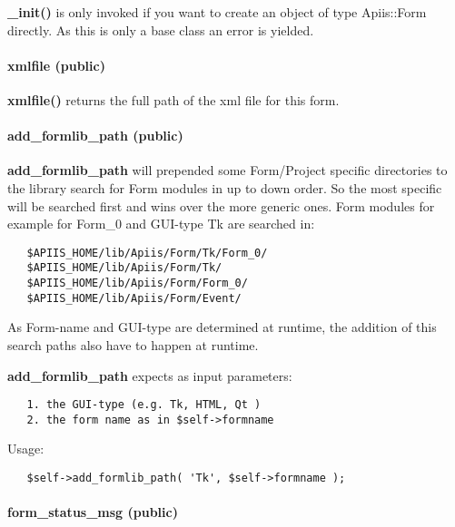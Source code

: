 \textbf{\_init()} is only invoked if you want to create an object of type
Apiis::Form directly. As this is only a base class an error is yielded.

\paragraph*{xmlfile (public)\label{Apiis::Form::Init_--_base_package_for_Form_objects_of_all_types_xmlfile_public_}}


\textbf{xmlfile()} returns the full path of the xml file for this form.

\paragraph*{add\_formlib\_path (public)\label{Apiis::Form::Init_--_base_package_for_Form_objects_of_all_types_add_formlib_path_public_}}


\textbf{add\_formlib\_path} will prepended some Form/Project specific directories to
the library search for Form modules in up to down order. So the most specific
will be searched first and wins over the more generic ones. Form modules for
example for Form\_0 and GUI-type Tk are searched in:

\begin{verbatim}
   $APIIS_HOME/lib/Apiis/Form/Tk/Form_0/
   $APIIS_HOME/lib/Apiis/Form/Tk/
   $APIIS_HOME/lib/Apiis/Form/Form_0/
   $APIIS_HOME/lib/Apiis/Form/Event/
\end{verbatim}


As Form-name and GUI-type are determined at runtime, the addition of this
search paths also have to happen at runtime.



\textbf{add\_formlib\_path} expects as input parameters:

\begin{verbatim}
   1. the GUI-type (e.g. Tk, HTML, Qt )
   2. the form name as in $self->formname
\end{verbatim}


Usage:

\begin{verbatim}
   $self->add_formlib_path( 'Tk', $self->formname );
\end{verbatim}
\paragraph*{form\_status\_msg (public)\label{Apiis::Form::Init_--_base_package_for_Form_objects_of_all_types_form_status_msg_public_}}


